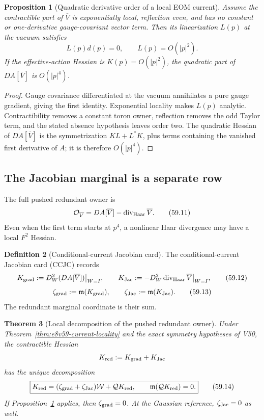 \documentclass[11pt,oneside]{book}
\newtheorem{theorem}{Theorem}[chapter]
\newtheorem{proposition}[theorem]{Proposition}
\theoremstyle{definition}
\newtheorem{definition}[theorem]{Definition}
\theoremstyle{remark}
\begin{document}
\begin{proposition}[Quadratic derivative order of a local EOM
current]
\label{prop:e8v59-current-order}
Assume the contractible part of \(\overline V\) is exponentially
local, reflection even, and has no constant or one-derivative
gauge-covariant vector term.  Then its linearization \(L(p)\) at
the vacuum satisfies
\[
 L(p)d(p)=0,\qquad L(p)=O(|p|^2).                             \tag{59.10}
\]
If the effective-action Hessian is \(K(p)=O(|p|^2)\), the
quadratic part of \(DA[\overline V]\) is \(O(|p|^4)\).
\end{proposition}

\begin{proof}
Gauge covariance differentiated at the vacuum annihilates a pure
gauge gradient, giving the first identity.  Exponential locality
makes \(L(p)\) analytic.  Contractibility removes a constant
toron owner, reflection removes the odd Taylor term, and the stated
absence hypothesis leaves order two.  The quadratic Hessian of
\(DA[\overline V]\) is the symmetrization
\(K L+L^*K\), plus terms containing the vanished first derivative
of \(A\); it is therefore \(O(|p|^4)\).
\end{proof}

\subsection{The Jacobian marginal is a separate row}

The full pushed redundant owner is
\[
 {\cal O}_{\overline V}
 =DA[\overline V]-\operatorname{div}_{\rm Haar}\overline V.   \tag{59.11}
\]
Even when the first term starts at \(p^4\), a nonlinear Haar
divergence may have a local \(F^2\) Hessian.

\begin{definition}[Conditional-current Jacobian card]
\label{def:e8v59-CCJC}
The conditional-current Jacobian card (CCJC) records
\[
 K_{\rm grad}:=D_W^2(DA[\overline V])\big|_{W=I},\qquad
 K_{\rm Jac}:=-D_W^2\operatorname{div}_{\rm Haar}
 \overline V\big|_{W=I},                                    \tag{59.12}
\]
\[
 \zeta_{\rm grad}:={\mathfrak m}(K_{\rm grad}),\qquad
 \zeta_{\rm Jac}:={\mathfrak m}(K_{\rm Jac}).                 \tag{59.13}
\]
The redundant marginal coordinate is their sum.
\end{definition}

\begin{theorem}[Local decomposition of the pushed redundant
owner]
\label{thm:e8v59-redundant-decomposition}
Under Theorem~\ref{thm:e8v59-current-locality} and the exact
symmetry hypotheses of V50, the contractible Hessian
\[
 K_{\rm red}:=K_{\rm grad}+K_{\rm Jac}
\]
has the unique decomposition
\[
 \boxed{
 K_{\rm red}
 =(\zeta_{\rm grad}+\zeta_{\rm Jac}){\cal W}
  +{\cal Q}K_{\rm red},\qquad
 {\mathfrak m}({\cal Q}K_{\rm red})=0.}                       \tag{59.14}
\]
If Proposition~\ref{prop:e8v59-current-order} applies, then
\(\zeta_{\rm grad}=0\).  At the Gaussian reference,
\(\zeta_{\rm Jac}=0\) as well.
\end{theorem}
\end{document}

